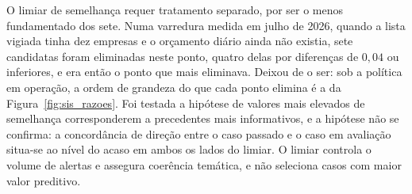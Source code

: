 O limiar de semelhança requer tratamento separado, por ser o menos fundamentado dos sete. Numa
varredura medida em julho de 2026, quando a lista vigiada tinha dez empresas e o orçamento diário
ainda não existia, sete candidatas foram eliminadas neste ponto, quatro delas por diferenças de
$0{,}04$ ou inferiores, e era então o ponto que mais eliminava. Deixou de o ser: sob a política
em operação, a ordem de grandeza do que cada ponto elimina é a da
Figura~\ref{fig:sis_razoes}. Foi testada a
hipótese de valores mais elevados de semelhança corresponderem a precedentes mais informativos, e
a hipótese não se confirma: a concordância de direção entre o caso passado e o caso em avaliação
situa-se ao nível do acaso em ambos os lados do limiar. O limiar controla o volume de alertas e
assegura coerência temática, e não seleciona casos com maior valor preditivo.

